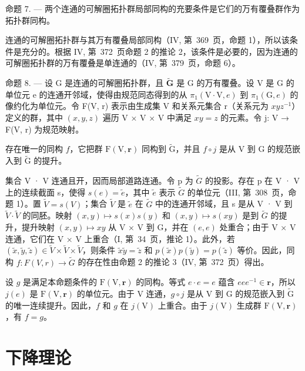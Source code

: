 命题 7. --- 两个连通的可解圈拓扑群局部同构的充要条件是它们的万有覆叠群作为拓扑群同构。

连通的可解圈拓扑群与其万有覆叠局部同构（IV, 第~369~页，命题 1），所以该条件是充分的。根据 IV, 第~372~页命题 2 的推论 2，该条件是必要的，因为连通的可解圈拓扑群的万有覆叠是单连通的（IV, 第~379~页，命题 6）。

命题 8. --- 设 G 是连通的可解圈拓扑群，且 \(\widetilde{\mathbf{G}}\) 是 G 的万有覆叠。设 V 是 G 的单位元 e 的连通开邻域，使得由规范同态得到的从 \(\pi_1(\mathrm{V} \cdot \mathrm{V}, e)\) 到 \(\pi_1(\mathrm{G}, e)\) 的像约化为单位元。令 F(V, r) 表示由生成集 V 和关系元集合 r（关系元为 \(xyz^{-1}\)）定义的群，其中 \((x, y, z)\) 遍历 V × V × V 中满足 \(xy = z\) 的元素。令 j: V → F(V, r) 为规范映射。

存在唯一的同构 \(f\)，它把群 \(\mathrm{F}(\mathrm{V},\mathbf{r})\) 同构到 \(\widetilde{\mathrm{G}}\)，并且 \(f \circ j\) 是从 V 到 G 的规范嵌入到 \(\widetilde{\mathrm{G}}\) 的提升。

集合 V · V 连通且开，因而局部道路连通。令 p 为 \(\widetilde{G}\) 的投影。存在 p 在 V · V 上的连续截面 s，使得 \(s(e) = \widetilde{e}\)，其中 \(\widetilde{e}\) 表示 \(\widetilde{G}\) 的单位元（III, 第~308~页，命题 1）。置 \(\widetilde{V} = s(V)\)；集合 \(\widetilde{V}\) 是 \(\widetilde{e}\) 在 \(\widetilde{G}\) 中的连通开邻域，且 s 是从 V · V 到 \(\widetilde{V} \cdot \widetilde{V}\) 的同胚。映射 \((x, y) \mapsto s(x)s(y)\) 和 \((x, y) \mapsto s(xy)\) 是到 \(\widetilde{G}\) 的提升，提升映射 \((x, y) \mapsto xy\) 从 V × V 到 G，并在 \((e, e)\) 处重合；由于 V × V 连通，它们在 V × V 上重合（I, 第~34~页，推论 1）。此外，若 \((\widetilde{x}, \widetilde{y}, \widetilde{z}) \in \widetilde{V} \times \widetilde{V} \times \widetilde{V}\)，则条件 \(\widetilde{x}\widetilde{y} = \widetilde{z}\) 和 \(p(\widetilde{x})p(\widetilde{y}) = p(\widetilde{z})\) 等价。因此，同构 \(f: F(V, r) \to \widetilde{G}\) 的存在性由命题 2 的推论 3（IV, 第~372~页）得出。

设 \(g\) 是满足本命题条件的 \(\mathrm{F}(\mathrm{V},\mathbf{r})\) 的同构。等式 \(e \cdot e = e\) 蕴含 \(eee^{-1} \in \mathbf{r}\)，所以 \(j(e)\) 是 \(\mathrm{F}(\mathrm{V},\mathbf{r})\) 的单位元。由于 V 连通，\(g \circ j\) 是从 V 到 G 的规范嵌入到 \(\widetilde{\mathrm{G}}\) 的唯一连续提升。因此，\(f\) 和 \(g\) 在 \(j(\mathrm{V})\) 上重合。由于 \(j(\mathrm{V})\) 生成群 \(\mathrm{F}(\mathrm{V},\mathbf{r})\)，有 \(f = g\)。

\section{下降理论}

